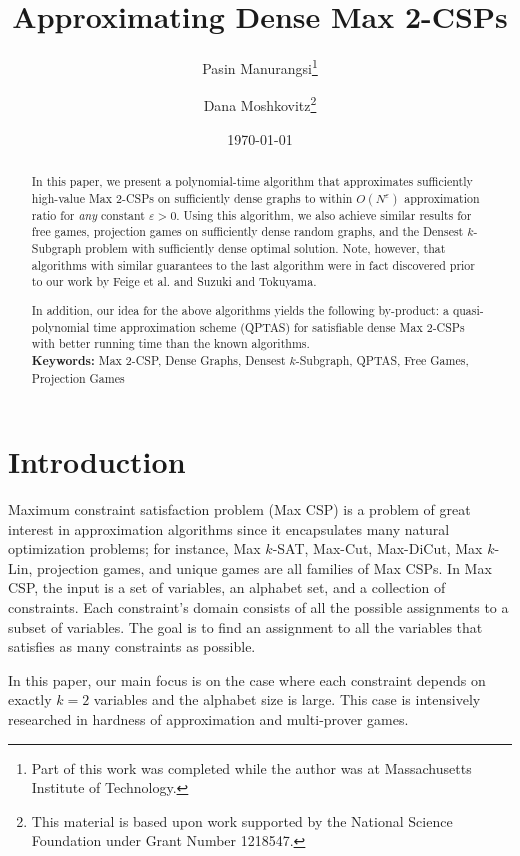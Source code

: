 \documentclass{article}
\title{Approximating Dense Max 2-CSPs}
\date{\today}
\author[1]{Pasin Manurangsi\thanks{Part of this work was completed while the author was at Massachusetts Institute of Technology.}}
\author[2]{Dana Moshkovitz\thanks{This material is based upon work supported by the National Science Foundation under Grant Number 1218547.}}
\affil[1]{Dropbox, Inc.\\
  San Francisco, CA 94107, USA\\
  \texttt{pasin@dropbox.com}}
\affil[2]{Massachusetts Institute of Technology \\
  Cambridge, MA 02139, USA\\
  \texttt{dmoshkov@mit.edu}}
\begin{document}
\maketitle


\begin{abstract}
In this paper, we present a polynomial-time algorithm that approximates sufficiently high-value {\sc Max 2-CSP}s on sufficiently dense graphs to within $O(N^{\varepsilon})$ approximation ratio for \emph{any} constant $\varepsilon > 0$. Using this algorithm, we also achieve similar results for free games, projection games on sufficiently dense random graphs, and the {\sc Densest $k$-Subgraph} problem with sufficiently dense optimal solution. Note, however, that algorithms with similar guarantees to the last algorithm were in fact discovered prior to our work by Feige et al. and Suzuki and Tokuyama.

In addition, our idea for the above algorithms yields the following by-product: a quasi-polynomial time approximation scheme (QPTAS) for satisfiable dense {\sc Max 2-CSP}s with better running time than the known algorithms. \\

{\bf Keywords:} {\sc Max 2-CSP}, Dense Graphs, {\sc Densest $k$-Subgraph}, QPTAS, Free Games, Projection Games
\end{abstract}

\section{Introduction}

Maximum constraint satisfaction problem ({\sc Max CSP}) is a problem of great interest in approximation algorithms since it encapsulates many natural optimization problems; for instance, {\sc Max $k$-SAT}, {\sc Max-Cut}, {\sc Max-DiCut}, {\sc Max $k$-Lin}, projection games, and unique games are all families of {\sc Max CSP}s. In {\sc Max CSP}, the input is a set of variables, an alphabet set, and a collection of constraints. Each constraint's domain consists of all the possible assignments to a subset of variables. The goal is to find an assignment to all the variables that satisfies as many constraints as possible.

In this paper, our main focus is on the case where each constraint depends on exactly $k=2$ variables and the alphabet size is large. This case is intensively researched in hardness of approximation and multi-prover games.
\end{document}
